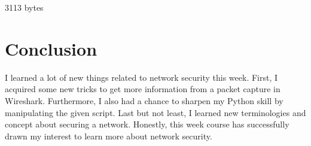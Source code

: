 \documentclass[letterpaper,10pt,titlepage,draftclsnofoot,onecolumn]{IEEEtran}
\begin{document}
3113 bytes
\hfill\\
\section{Conclusion}
I learned a lot of new things related to network security this week.
First, I acquired some new tricks to get more information from a packet capture in Wireshark.
Furthermore, I also had a chance to sharpen my Python skill by manipulating the given script.
Last but not least, I learned new terminologies and concept about securing a network.
Honestly, this week course has successfully drawn my interest to learn more about network security. 
\end{document}
